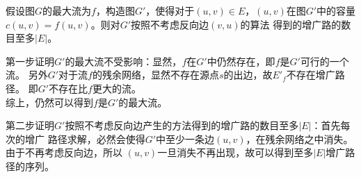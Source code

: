 \begin{solution}
    假设图$G$的最大流为$f$，构造图$G'$，使得对于$(u,v)\in E$，$(u,v)$在图$G'$中的容量
    $c(u,v)=f(u,v)$。则对$G'$按照不考虑反向边$(v,u)$的算法
    得到的增广路的数目至多$|E|$。
    
    第一步证明$G'$的最大流不受影响：显然，$f$在$G'$中仍然存在，即$f$是$G'$可行的一个流。
    另外$G'$对于流$f$的残余网络，显然不存在源点$s$的出边，故$E'_f$不存在增广路径。
    即$G'$不存在比$f$更大的流。\\
    综上，仍然可以得到$f$是$G'$的最大流。

    第二步证明$G'$按照不考虑反向边产生的方法得到的增广路的数目至多$|E|$：首先每次的增广
    路径求解，必然会使得$G'$中至少一条边$(u,v)$，在残余网络之中消失。由于不再考虑反向边，所以
    $(u,v)$一旦消失不再出现，故可以得到至多$|E|$增广路径的序列。                                                                                                                                                                                                                                                                                                                                                                                                                                                                                                                                                                                                                                                                                                                                                                                                                                                                                                                                                                                                                                                                                                                                                                                                                                                                                                                                                                                                                                                                                                                                                                                                                                                                                                                                                                                                                                                                                                                                               
\end{solution}